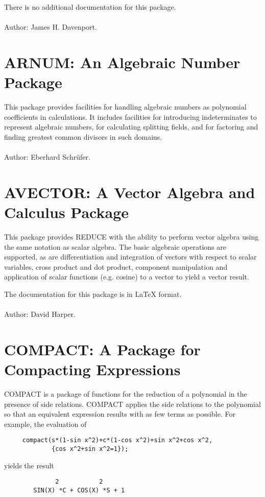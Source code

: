 There is no additional documentation for this package.
\\ \\
Author: James H. Davenport.

\section{ARNUM: An Algebraic Number Package} 

This package provides facilities for handling algebraic numbers as
polynomial coefficients in {\REDUCE} calculations. It includes facilities for
introducing indeterminates to represent algebraic numbers, for calculating
splitting fields, and for factoring and finding greatest common divisors
in such domains.
\\ \\
Author: Eberhard Schr\"ufer.

\section{AVECTOR: A Vector Algebra and Calculus Package} 

This package provides REDUCE with the ability to perform vector algebra
using the same notation as scalar algebra.  The basic algebraic operations
are supported, as are differentiation and integration of vectors with
respect to scalar variables, cross product and dot product, component
manipulation and application of scalar functions (e.g. cosine) to a vector
to yield a vector result.

The documentation for this package is in {\LaTeX} format.
\\ \\
Author: David Harper.

\section{COMPACT: A Package for Compacting Expressions} 

COMPACT is a package of functions for the reduction of a polynomial in the
presence of side relations.  COMPACT applies the side relations to the
polynomial so that an equivalent expression results with as few terms as
possible.  For example, the evaluation of
\begin{verbatim}
     compact(s*(1-sin x^2)+c*(1-cos x^2)+sin x^2+cos x^2,
             {cos x^2+sin x^2=1});
\end{verbatim}
yields the result
\begin{verbatim}
              2           2
        SIN(X) *C + COS(X) *S + 1
\end{verbatim}

